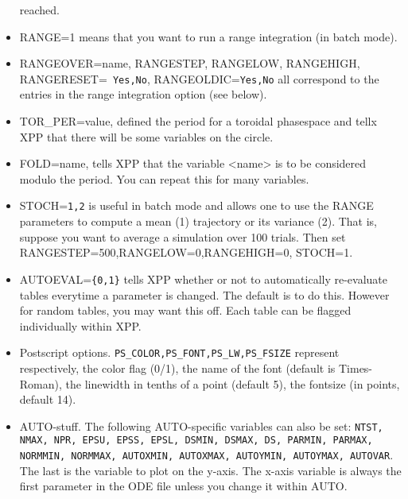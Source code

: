 \documentclass{article}
\begin{document}
\begin{itemize}
reached.
\item RANGE=1 means that you want to run a range integration (in batch
mode).
\item RANGEOVER=name, RANGESTEP, RANGELOW, RANGEHIGH, RANGERESET={\tt
Yes,No}, RANGEOLDIC={\tt Yes,No} all correspond to the entries in the
range integration option (see below).
\item TOR\_PER=value, defined the period for a toroidal phasespace and
tellx XPP that there will be some variables on the circle.
\item FOLD=name, tells XPP that the variable <name> is to be
considered modulo the period.  You can repeat this for many variables.
\item STOCH={\tt 1,2} is useful in batch mode and allows one to use
the RANGE parameters to compute a mean (1) trajectory or its variance
(2).  That is, suppose you want to average a simulation over 100
trials.  Then set RANGESTEP=500,RANGELOW=0,RANGEHIGH=0, STOCH=1.
\item AUTOEVAL={\tt \{0,1\}} tells XPP whether or not to automatically
re-evaluate tables everytime a parameter is changed. The default is
to do this. However for random tables, you may want this off. Each
table can be flagged individually within XPP.
\item Postscript options. {\tt PS\_COLOR,PS\_FONT,PS\_LW,PS\_FSIZE}
represent respectively, the color flag (0/1), the name of the font
(default is Times-Roman), the linewidth in tenths of a point (default
5), the fontsize (in points, default 14).
\item AUTO-stuff. The following AUTO-specific variables can also be
set: {\tt NTST, NMAX, NPR, EPSU, EPSS, EPSL, DSMIN, DSMAX, DS, PARMIN, PARMAX, NORMMIN,
NORMMAX, AUTOXMIN, AUTOXMAX, AUTOYMIN, AUTOYMAX, AUTOVAR}.  The last
is the variable to plot on the y-axis. The x-axis variable is always
the first parameter in the ODE file unless you change it within AUTO.
\end{itemize}
\end{document}
